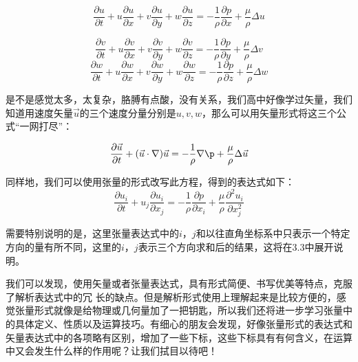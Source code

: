 \documentclass{ctexart}
\begin{document}
 $$ \frac{\partial u}{\partial t}+u \frac{\partial u}{\partial x}+v \frac{\partial u}{\partial y}+w \frac{\partial u}{\partial z}=-\frac{1}{\rho} \frac{\partial p}{\partial x}+\frac{\mu}{\rho} \Delta u $$
 
 $$ \frac{\partial v}{\partial t}+u \frac{\partial v}{\partial x}+v \frac{\partial v}{\partial y}+w \frac{\partial v}{\partial z}=-\frac{1}{\rho} \frac{\partial p}{\partial y}+\frac{\mu}{\rho} \Delta v $$
 $$ \frac{\partial w}{\partial t}+u \frac{\partial w}{\partial x}+v \frac{\partial w}{\partial y}+w \frac{\partial w}{\partial z}=-\frac{1}{\rho} \frac{\partial p}{\partial z}+\frac{\mu}{\rho} \Delta w $$
 
 是不是感觉太多，太复杂，胳膊有点酸，没有关系，我们高中好像学过矢量，我们知道用速度矢量$\vec{u}$的三个速度分量分别是$u,v,w$，那么可以用矢量形式将这三个公式“一网打尽”：
 
 $$\frac{\partial \vec{u}}{\partial t}+(\vec{u} \cdot \nabla) \vec{u}=-\frac{1}{\rho} \nabla \p+\frac{\mu}{\rho} \Delta \vec{u} $$
 
 同样地，我们可以使用张量的形式改写此方程，得到的表达式如下：
 $$ \frac{\partial u_{i}}{\partial t}+u_{j} \frac{\partial u_{i}}{\partial x_{j}}=-\frac{1}{\rho} \frac{\partial p}{\partial x_{i}}+\frac{\mu}{\rho} \frac{\partial^{2} u_{i}}{\partial x_{j}^{2}} $$
 \par
 需要特别说明的是，这里张量表达式中的$i$，$j$和以往直角坐标系中只表示一个特定方向的量有所不同，这里的$i$，$j$表示三个方向求和后的结果，这将在3.3中展开说明。
 
 我们可以发现，使用矢量或者张量表达式，具有形式简便、书写优美等特点，克服了解析表达式中的冗
 长的缺点。但是解析形式使用上理解起来是比较方便的，感觉张量形式就像是给物理或几何量加了一把钥匙，所以我们还将进一步学习张量中的具体定义、性质以及运算技巧。有细心的朋友会发现，好像张量形式的表达式和矢量表达式中的各项略有区别，增加了一些下标，这些下标具有有何含义，在运算中又会发生什么样的作用呢？让我们拭目以待吧！
\end{document}
